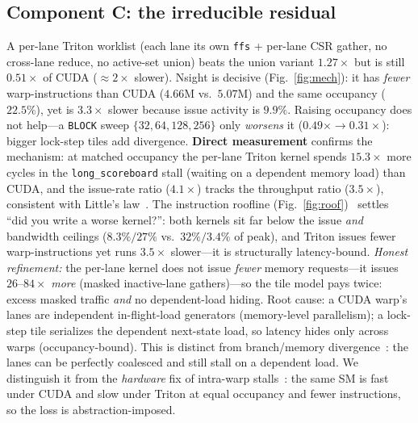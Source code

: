 \documentclass[conference]{IEEEtran}
\begin{document}
\subsection{Component C: the irreducible residual}\label{sec:resid}
A per-lane Triton worklist (each lane its own \texttt{ffs} + per-lane CSR gather, no cross-lane reduce,
no active-set union) beats the union variant $1.27\times$ but is still $0.51\times$ of CUDA
($\approx 2\times$ slower). Nsight is decisive (Fig.~\ref{fig:mech}): it has \emph{fewer}
warp-instructions than CUDA ($4.66$M vs.\ $5.07$M) and the same occupancy ($22.5\%$), yet is $3.3\times$
slower because issue activity is $9.9\%$. Raising occupancy does not help---a \texttt{BLOCK} sweep
$\{32,64,128,256\}$ only \emph{worsens} it ($0.49\times \rightarrow 0.31\times$): bigger lock-step
tiles add divergence. \textbf{Direct measurement} confirms the mechanism: at matched occupancy the
per-lane Triton kernel spends $15.3\times$ more cycles in the \texttt{long\_scoreboard} stall (waiting
on a dependent memory load) than CUDA, and the issue-rate ratio ($4.1\times$) tracks the throughput
ratio ($3.5\times$), consistent with Little's law~\cite{volkov2016latency,hongkim2009}. The
instruction roofline (Fig.~\ref{fig:roof})~\cite{instroofline2022} settles ``did you write a worse
kernel?'': both kernels sit far below the issue \emph{and} bandwidth ceilings ($8.3\%/27\%$ vs.\
$32\%/3.4\%$ of peak), and Triton issues fewer warp-instructions yet runs $3.5\times$ slower---it is
structurally latency-bound. \emph{Honest refinement:} the per-lane kernel does not issue \emph{fewer}
memory requests---it issues $26$--$84\times$ \emph{more} (masked inactive-lane gathers)---so the tile
model pays twice: excess masked traffic \emph{and} no dependent-load hiding. Root cause: a CUDA warp's
lanes are independent in-flight-load generators (memory-level parallelism); a lock-step tile serializes
the dependent next-state load, so latency hides only across warps (occupancy-bound). This is distinct
from branch/memory divergence~\cite{fung2007}: the lanes can be perfectly coalesced and still stall on
a dependent load. We distinguish it from the \emph{hardware} fix of intra-warp stalls~\cite{subwarp2022}:
the same SM is fast under CUDA and slow under Triton at equal occupancy and fewer instructions, so the
loss is abstraction-imposed.
\end{document}
